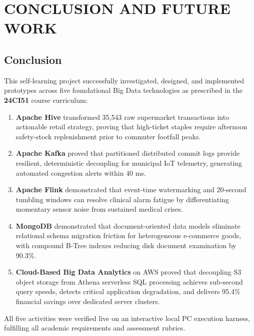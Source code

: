 \documentclass[12pt,a4paper]{report}
\begin{document}
\chapter{CONCLUSION AND FUTURE WORK}

\section{Conclusion}
This self-learning project successfully investigated, designed, and implemented prototypes across five foundational Big Data technologies as prescribed in the \textbf{24CI51} course curriculum:
\begin{enumerate}
    \item \textbf{Apache Hive} transformed 35,543 raw supermarket transactions into actionable retail strategy, proving that high-ticket staples require afternoon safety-stock replenishment prior to commuter footfall peaks.
    \item \textbf{Apache Kafka} proved that partitioned distributed commit logs provide resilient, deterministic decoupling for municipal IoT telemetry, generating automated congestion alerts within 40 ms.
    \item \textbf{Apache Flink} demonstrated that event-time watermarking and 20-second tumbling windows can resolve clinical alarm fatigue by differentiating momentary sensor noise from sustained medical crises.
    \item \textbf{MongoDB} demonstrated that document-oriented data models eliminate relational schema migration friction for heterogeneous e-commerce goods, with compound B-Tree indexes reducing disk document examination by 90.3\%.
    \item \textbf{Cloud-Based Big Data Analytics} on AWS proved that decoupling S3 object storage from Athena serverless SQL processing achieves sub-second query speeds, detects critical application degradation, and delivers 95.4\% financial savings over dedicated server clusters.
\end{enumerate}

All five activities were verified live on an interactive local PC execution harness, fulfilling all academic requirements and assessment rubrics.
\end{document}
